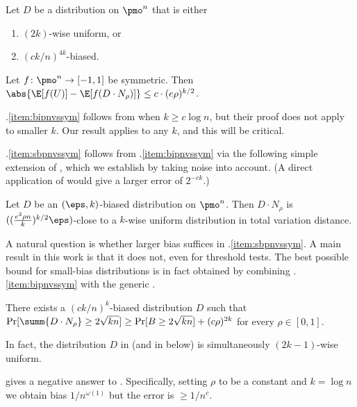 \begin{theorem} \label{thm:bipnvssym}
Let $D$ be a distribution on $\pmo^n$ that is either
\begin{enumerate}[label=(\roman*),itemsep=2pt,parsep=0pt,topsep=2pt]
  \item \label{item:bipnvssym} $(2k)$-wise uniform, or
  \item \label{item:sbpnvssym} $(ck/n)^{4k}$-biased.
\end{enumerate}
Let $f\colon\pmo^n \to [-1,1]$ be symmetric.  Then $\abs{\E[f(U)] - \E[f(D \cdot N_\rho)] } \le c \cdot (e\rho)^{k/2}$.
\end{theorem}

.\ref{item:bipnvssym} follows from \cite{ForbesKelley-2018} when $k\ge c\log n$, but their proof does not apply to smaller $k$.  Our result applies to any $k$, and this will be critical.

.\ref{item:sbpnvssym} follows from .\ref{item:bipnvssym} via the following simple extension of , which we establish by taking noise into account.  (A direct application of  would give a larger error of $2^{-ck}$.)

\begin{lemma} \label{lemma:OZ-noise} 
  Let $D$ be an $(\eps,k)$-biased distribution on $\pmo^n$.
  Then $D \cdot N_\rho$ is $((\frac{e^3\rho n}{k})^{k/2} \eps)$-close to a $k$-wise uniform distribution in total variation distance.
\end{lemma}

A natural question is whether larger bias suffices in .\ref{item:sbpnvssym}.  A main result in this work is that it does not, even for threshold tests.  The best possible bound for small-bias distributions is in fact obtained by combining .\ref{item:bipnvssym} with the generic .  

\begin{theorem} \label{thm:sbpn-vs-uniform}
  There exists a $(ck/n)^k$-biased distribution $D$ such that $\Pr[\summ{D \cdot N_\rho} \ge 2\sqrt{kn}] \ge \Pr[ B \ge 2\sqrt{kn}] + (c\rho)^{2k}$ for every $\rho \in [0,1]$.
\end{theorem}

In fact, the distribution $D$ in  (and 
in  below) is simultaneously $(2k-1)$-wise uniform.

 gives a negative answer to .
Specifically, setting $\rho$ to be a constant and $k = \log n$ we obtain bias $1/n^{\omega(1)}$ but the error is $\ge 1/n^c$.

